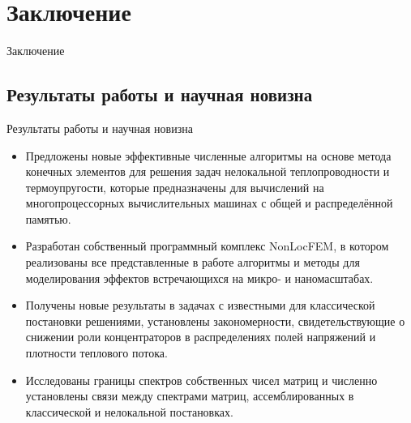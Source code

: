 \section{Заключение}

\begin{frame}
	\centering
	\Huge
	Заключение
\end{frame}


\subsection{Результаты работы и научная новизна}
\begin{frame}{Результаты работы и научная новизна}
    \begin{itemize}
    		\justifying
        \item Предложены новые эффективные численные алгоритмы на основе метода конечных элементов для решения задач нелокальной теплопроводности и термоупругости, которые предназначены для вычислений на многопроцессорных вычислительных машинах с общей и распределённой памятью.
        \item Разработан собственный программный комплекс NonLocFEM, в котором реализованы все представленные в работе алгоритмы и методы для моделирования эффектов встречающихся на микро- и наномасштабах.
        \item Получены новые результаты в задачах с известными для классической постановки решениями, установлены закономерности, свидетельствующие о снижении роли концентраторов в распределениях полей напряжений и плотности теплового потока.
        \item Исследованы границы спектров собственных чисел матриц и численно установлены связи между спектрами матриц, ассемблированных в классической и нелокальной постановках.
    \end{itemize}
\end{frame}

